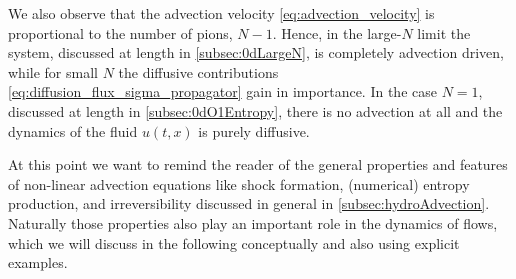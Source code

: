 We also observe that the advection velocity \eqref{eq:advection_velocity} is proportional to the number of pions, $ N - 1 $.
Hence, in the large-$N$ limit the system, discussed at length in \cref{subsec:0dLargeN}, is completely advection driven, while for small $N$ the diffusive contributions \eqref{eq:diffusion_flux_sigma_propagator} gain in importance.
In the case $N = 1$, discussed at length in \cref{subsec:0dO1Entropy}, there is no advection at all and the dynamics of the fluid $u ( t, x )$ is purely diffusive.

At this point we want to remind the reader of the general properties and features of non-linear advection equations \dash{} like shock formation, (numerical) entropy production, and irreversibility \dash{}
discussed in general in \cref{subsec:hydroAdvection}.
Naturally those properties also play an important role in the dynamics of \frg{} flows, which we will discuss in the following conceptually and also using explicit examples.

